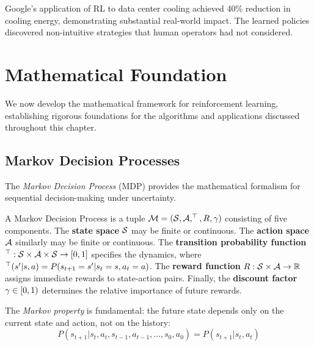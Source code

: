 Google's application of RL to data center cooling achieved 40\% reduction in cooling energy, demonstrating substantial real-world impact. The learned policies discovered non-intuitive strategies that human operators had not considered.

\section{Mathematical Foundation}
\label{sec:math_foundation}

We now develop the mathematical framework for reinforcement learning, establishing rigorous foundations for the algorithms and applications discussed throughout this chapter.

\subsection{Markov Decision Processes}

The \textit{Markov Decision Process} (MDP) provides the mathematical formalism for sequential decision-making under uncertainty.

\begin{definition}
A Markov Decision Process is a tuple $\mathcal{M} = (\mathcal{S}, \mathcal{A}, ^\top, R, \gamma)$ consisting of five components. The \textbf{state space} $\mathcal{S}$ may be finite or continuous. The \textbf{action space} $\mathcal{A}$ similarly may be finite or continuous. The \textbf{transition probability function} $^\top: \mathcal{S} \times \mathcal{A} \times \mathcal{S} \rightarrow [0,1]$ specifies the dynamics, where $^\top(s'|s,a) = P(s_{t+1} = s' | s_t = s, a_t = a)$. The \textbf{reward function} $R: \mathcal{S} \times \mathcal{A} \rightarrow \mathbb{R}$ assigns immediate rewards to state-action pairs. Finally, the \textbf{discount factor} $\gamma \in [0,1)$ determines the relative importance of future rewards.
\end{definition}

The \textit{Markov property} is fundamental: the future state depends only on the current state and action, not on the history:
\begin{equation}
P(s_{t+1} | s_t, a_t, s_{t-1}, a_{t-1}, \ldots, s_0, a_0) = P(s_{t+1} | s_t, a_t)
\end{equation}

